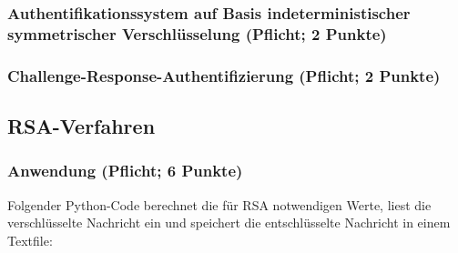 \documentclass{article}
\begin{document}
\subsubsection{Authentifikationssystem auf Basis indeterministischer symmetrischer Verschlüsselung (Pflicht; 2 Punkte)}
\subsubsection{Challenge-Response-Authentifizierung (Pflicht; 2 Punkte) }


\subsection{RSA-Verfahren}
\subsubsection{Anwendung (Pflicht; 6 Punkte)}
Folgender Python-Code berechnet die für RSA notwendigen Werte, liest die verschlüsselte Nachricht ein und speichert die entschlüsselte Nachricht in einem Textfile:
\end{document}
